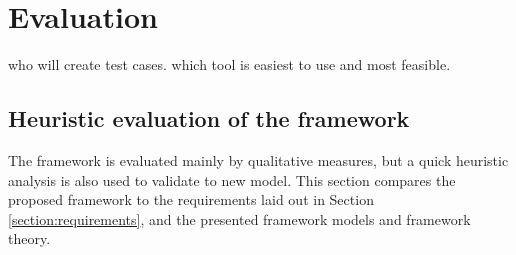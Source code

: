 \documentclass[12pt,a4paper,oneside,pdftex]{report}
\begin{document}
{%

\chapter{Evaluation}
\label{chapter:evaluation}

who will create test cases. which tool is easiest to use and most feasible.


\section{Heuristic evaluation of the framework}

The framework is evaluated mainly by qualitative measures, but a quick heuristic analysis is also used to validate to new model. This section compares the proposed framework to the requirements laid out in Section \ref{section:requirements}, and the presented framework models and framework theory.

}
\end{document}
